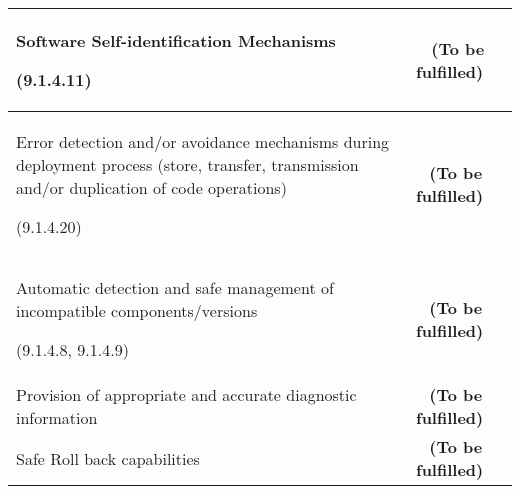\documentclass{template/openetcs_article}
\begin{document}
\begin{appendices}
\begin{center}
\begin{longtable}[H]{|m{}|m{}|}
\hline \hline
\endlastfoot

Software Self-identification Mechanisms

(9.1.4.11) &
~
\textbf{(To be fulfilled)} \\\hline
Error detection and/or avoidance mechanisms during deployment process (store, transfer, transmission and/or duplication of code operations)

(9.1.4.20) &
~
\textbf{(To be fulfilled)} \\\hline
Automatic detection and safe management of incompatible components/versions

(9.1.4.8, 9.1.4.9) &
~
\textbf{(To be fulfilled)} \\\hline
Provision of appropriate and accurate diagnostic information &
~
\textbf{(To be fulfilled)} \\\hline
Safe Roll back capabilities  &
~
\textbf{(To be fulfilled)} \\\hline
\end{longtable}
\end{center}
\end{appendices}




\end{document}
